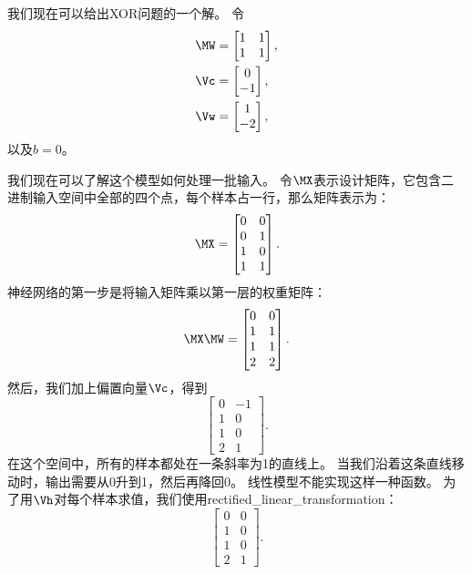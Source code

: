 

我们现在可以给出XOR问题的一个解。
令
\begin{align}
\MW &= \begin{bmatrix}
1 & 1\\
1 & 1
\end{bmatrix},\\
\Vc &= \begin{bmatrix}
0\\
-1
\end{bmatrix},\\
\Vw &= \begin{bmatrix}
1\\
-2
\end{bmatrix},
\end{align}
以及$b=0$。

我们现在可以了解这个模型如何处理一批输入。
令$\MX$表示设计矩阵，它包含二进制输入空间中全部的四个点，每个样本占一行，那么矩阵表示为：
\begin{equation} 
\MX = \begin{bmatrix}
0 & 0\\
0 & 1\\ 
1 & 0\\ 
1 & 1
\end{bmatrix}. 
\end{equation} 
神经网络的第一步是将输入矩阵乘以第一层的权重矩阵： 
\begin{equation}
\MX\MW = \begin{bmatrix} 
0 & 0\\ 
1 & 1\\ 
1 & 1\\ 
2 & 2 
\end{bmatrix}.
\end{equation} 
然后，我们加上偏置向量$\Vc$，得到 
\begin{equation} 
\begin{bmatrix} 
0 & -1\\
1 & 0\\ 
1 & 0\\ 
2 & 1 
\end{bmatrix}. 
\end{equation}
在这个空间中，所有的样本都处在一条斜率为1的直线上。
当我们沿着这条直线移动时，输出需要从0升到1，然后再降回0。
线性模型不能实现这样一种函数。
为了用$\Vh$对每个样本求值，我们使用\gls{rectified_linear_transformation}： 
\begin{equation}
\begin{bmatrix} 
0 & 0\\ 
1 & 0\\ 
1 & 0\\ 
2 & 1 
\end{bmatrix}. 
\end{equation}


